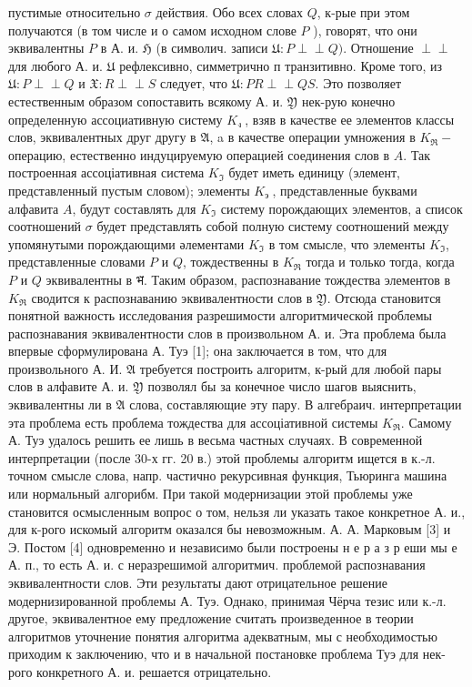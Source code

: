 \documentclass[10pt]{article}
\def\Perp{\perp\!\!\!\perp}
\begin{document}
пустимые относительно $\sigma$ действия. Обо всех словах $Q$, к-рые при этом получаются (в том числе и о самом исходном слове $P$ ), говорят, что они эквивалентны $P$ в А. и. $\mathfrak{H}$ (в символич. записи $\mathfrak{U}: P \Perp Q)$. Отношение $\Perp$ для любого А. и. $\mathfrak{U}$ рефлексивно, симметрично п транзитивно. Кроме того, из $\mathfrak{U}: P \Perp Q$ и $\mathfrak{X}: R \Perp S$ следует, что $\mathfrak{U}: P R \Perp Q S$. Это позволяет естественным образом сопоставить всякому А. и. $\mathfrak{Y}$ нек-рую конечно определенную ассоциативную систему $K_{\text {ง }}$, взяв в качестве ее элементов классы слов, эквивалентных друг другу в $\mathfrak{A}$, a в качестве операции умножения в $K_{\Re}-$ операцию, естественно индуцируемую операцией соединения слов в $A$. Так построенная ассоціативная система $K_{\Im}$ будет иметь единицу (элемент, представленный пустым словом); элементы $K_{\text {э }}$, представленные буквами алфавита $A$, будут составлять для $K_{\Im}$ систему порождающих элементов, а список соотношений $\sigma$ будет представлять собой полную систему соотношений между упомянутыми порождающими әлементами $K_{\Im}$ в том смысле, что элементы $K_{\Im}$, представленные словами $P$ и $Q$, тождественны в $K_{\Re}$ тогда и только тогда, когда $P$ и $Q$ эквивалентны в भ̆. Таким образом, распознавание тождества элементов в $K_{\Re}$ сводится к распознаванию эквивалентности слов в $\mathfrak{Y}$. Отсюда становится понятной важность исследования разрешимости алгоритмической проблемы распознавания эквивалентности слов в произвольном А. и. Эта проблема была впервые сформулирована А. Туэ [1]; она заключается в том, что для произвольного А. И. $\mathfrak{A}$ требуется построить алгоритм, к-рый для любой пары слов в алфавите А. и. $\mathfrak{Y}$ позволял бы за конечное число шагов выяснить, эквивалентны ли в $\mathfrak{A}$ слова, составляющие эту пару. В алгебраич. интерпретации эта проблема есть проблема тождества для ассоціативной системы $K_{\Re}$. Самому А. Туэ удалось решить ее лишь в весьма частных случаях. В современной интерпретации (после 30-х гг. 20 в.) этой проблемы алгоритм ищется в к.-л. точном смысле слова, напр. частично рекурсивная функция, Тьюринга машина или нормальный алгорибм. При такой модернизации этой проблемы уже становится осмысленным вопрос о том, нельзя ли указать такое конкретное А. и., для к-рого искомый алгоритм оказался бы невозможным. А. А. Марковым [3] и Э. Постом [4] одновременно и независимо были построены н е р а з р еши мы е А. п., то есть А. и. с неразрешимой алгоритмич. проблемой распознавания эквивалентности слов. Эти результаты дают отрицательное решение модернизированной проблемы А. Туэ. Однако, принимая Чёрча тезис или к.-л. другое, эквивалентное ему предложение считать произведенное в теории алгоритмов уточнение понятия алгоритма адекватным, мы с необходимостью приходим к заключению, что и в начальной постановке проблема Туэ для нек-рого конкретного А. и. решается отрицательно.
\end{document}
